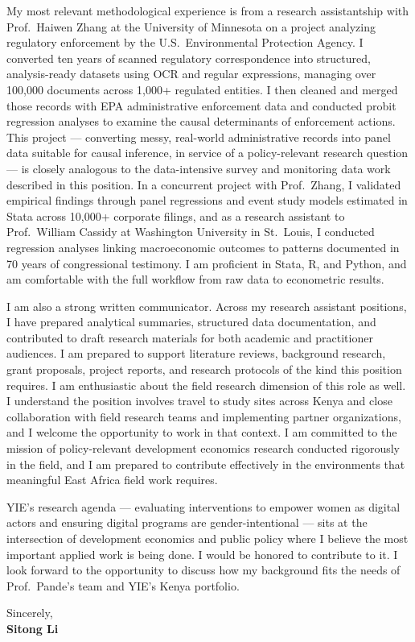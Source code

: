 \documentclass[12pt]{article}
\begin{document}
My most relevant methodological experience is from a research assistantship with Prof.\ Haiwen Zhang at the University of Minnesota on a project analyzing regulatory enforcement by the U.S.\ Environmental Protection Agency. I converted ten years of scanned regulatory correspondence into structured, analysis-ready datasets using OCR and regular expressions, managing over 100,000 documents across 1,000+ regulated entities. I then cleaned and merged those records with EPA administrative enforcement data and conducted probit regression analyses to examine the causal determinants of enforcement actions. This project --- converting messy, real-world administrative records into panel data suitable for causal inference, in service of a policy-relevant research question --- is closely analogous to the data-intensive survey and monitoring data work described in this position. In a concurrent project with Prof.\ Zhang, I validated empirical findings through panel regressions and event study models estimated in Stata across 10,000+ corporate filings, and as a research assistant to Prof.\ William Cassidy at Washington University in St.\ Louis, I conducted regression analyses linking macroeconomic outcomes to patterns documented in 70 years of congressional testimony. I am proficient in Stata, R, and Python, and am comfortable with the full workflow from raw data to econometric results.

I am also a strong written communicator. Across my research assistant positions, I have prepared analytical summaries, structured data documentation, and contributed to draft research materials for both academic and practitioner audiences. I am prepared to support literature reviews, background research, grant proposals, project reports, and research protocols of the kind this position requires. I am enthusiastic about the field research dimension of this role as well. I understand the position involves travel to study sites across Kenya and close collaboration with field research teams and implementing partner organizations, and I welcome the opportunity to work in that context. I am committed to the mission of policy-relevant development economics research conducted rigorously in the field, and I am prepared to contribute effectively in the environments that meaningful East Africa field work requires.

YIE's research agenda --- evaluating interventions to empower women as digital actors and ensuring digital programs are gender-intentional --- sits at the intersection of development economics and public policy where I believe the most important applied work is being done. I would be honored to contribute to it. I look forward to the opportunity to discuss how my background fits the needs of Prof.\ Pande's team and YIE's Kenya portfolio.

\vspace{1em}

\noindent Sincerely,\\[0.5em]
\textbf{Sitong Li}
\end{document}
